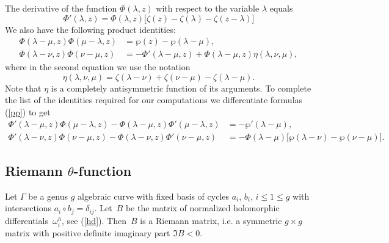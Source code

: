 \documentclass[a4paper,11pt]{article}
\theoremstyle{plain}
\theoremstyle{remark}
\begin{document}
The derivative of the function $\Phi(\lambda,z)$ with respect to the
variable $\lambda$ equals
\begin{equation}
\Phi'(\lambda,z) = \Phi(\lambda,z)
\bigl[ \zeta(z)-\zeta(\lambda)-\zeta(z-\lambda) \bigr]
\end{equation}
We also have the following product identities:
\begin{equation}\label{pp}
\begin{aligned}
\Phi(\lambda-\mu,z)\Phi(\mu-\lambda,z) &=\wp(z)-\wp(\lambda-\mu),\\
\Phi(\lambda-\nu,z)\Phi(\nu-\mu,z) &= -\Phi'(\lambda-\mu,z)+
\Phi(\lambda-\mu,z) \eta(\lambda,\nu,\mu) ,
\end{aligned}
\end{equation}
where in the second equation we use the notation
$$
\eta(\lambda,\nu,\mu)=
\zeta(\lambda-\nu)+\zeta(\nu-\mu)-\zeta(\lambda-\mu) .
$$
Note that $\eta$ is a completely antisymmetric function of its
arguments.
To complete the list of the identities required for our
computations we differentiate formulas (\ref{pp}) to get
\begin{equation}\label{ppp}
\begin{aligned}
\Phi'(\lambda-\mu,z)\Phi(\mu-\lambda,z)-
\Phi(\lambda-\mu,z)\Phi'(\mu-\lambda,z) &=-\wp'(\lambda-\mu),\\
\Phi'(\lambda-\nu,z)\Phi(\nu-\mu,z)-
\Phi(\lambda-\nu,z)\Phi'(\nu-\mu,z) &=
-\Phi(\lambda-\mu) \bigl[ \wp(\lambda-\nu)-\wp(\nu-\mu) \bigr] .
\end{aligned}
\end{equation}

\subsection{Riemann $\theta$-function}

Let $\Gamma$ be a genus $g$ algebraic curve with fixed basis of cycles
$a_i$, $b_i$, $i\le 1\le g$ with intersections $a_i\circ b_j=\delta_{ij}$.
Let~$B$ be the matrix of normalized holomorphic differentials~$\omega^h_i$,
see (\ref{hd}). Then~$B$ is a Riemann matrix, i.e. a symmetric $g\times g$
matrix with positive definite imaginary part $\Im B<0$.
\end{document}
